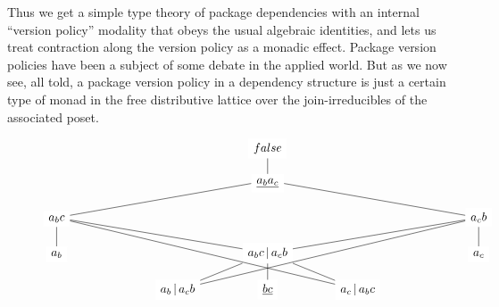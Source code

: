 \documentclass[hoptionsi,review,screen,format=sigconf]{acmart}
\theoremstyle{definition}
\newcommand{\bor}{\mathop{|}}
\begin{document}
Thus we get a simple type theory of package dependencies with an internal ``version policy'' modality that obeys the usual algebraic identities, and lets us treat contraction along the version policy as a monadic effect. Package version policies have been a subject of some debate in the applied world. But as we now see, all told, a package version policy in a dependency structure is just a certain type of monad in the free distributive lattice over the join-irreducibles of the associated poset.


\begin{figure}
\begin{equation*}
\begin{tikzcd}[row sep=scriptsize, column sep=large,cells={nodes={fill=white,fill opacity=1}}]
                            &  &                                                                          & false                                                                                              &                                                                          &  &                             \\
                            &  &                                                                          & \underline{a_b a_c} \arrow[u, no head]                                                                         &                                                                          &  &                             \\
a_b c \arrow[rrru, no head] &  &                                                                          &                                                                                                    &                                                                          &  & a_c b \arrow[lllu, no head] \\
a_b \arrow[u, no head]      &  &                                                                          & a_b c \bor a_c b \arrow[lllu, no head] \arrow[rrru, no head]                                       &                                                                          &  & a_c \arrow[u, no head]      \\
                            &  & a_b \bor a_c b \arrow[ru, no head] \arrow[rrrruu, no head]               & \underline{bc} \arrow[u, no head]                                                                              & a_c \bor a_b c \arrow[lu, no head] \arrow[lllluu, no head]               &  &                             \\[10pt]

\end{tikzcd}
\end{equation*}
\end{figure}
\end{document}

